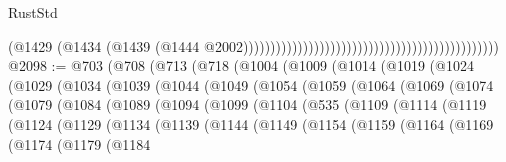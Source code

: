 \begin{lexlean}{RustStd}
\begin{coremodule}
                                                                                          (@1429
                                                                                            (@1434
                                                                                              (@1439
                                                                                                (@1444
                                                                                                  @2002)))))))))))))))))))))))))))))))))))))))))))))))
@2098 := @703
    (@708
      (@713
        (@718
          (@1004
            (@1009
              (@1014
                (@1019
                  (@1024
                    (@1029
                      (@1034
                        (@1039
                          (@1044
                            (@1049
                              (@1054
                                (@1059
                                  (@1064
                                    (@1069
                                      (@1074
                                        (@1079
                                          (@1084
                                            (@1089
                                              (@1094
                                                (@1099
                                                  (@1104
                                                    (@535
                                                      (@1109
                                                        (@1114
                                                          (@1119
                                                            (@1124
                                                              (@1129
                                                                (@1134
                                                                  (@1139
                                                                    (@1144
                                                                      (@1149
                                                                        (@1154
                                                                          (@1159
                                                                            (@1164
                                                                              (@1169
                                                                                (@1174
                                                                                  (@1179
                                                                                    (@1184

\end{coremodule}
\end{lexlean}
